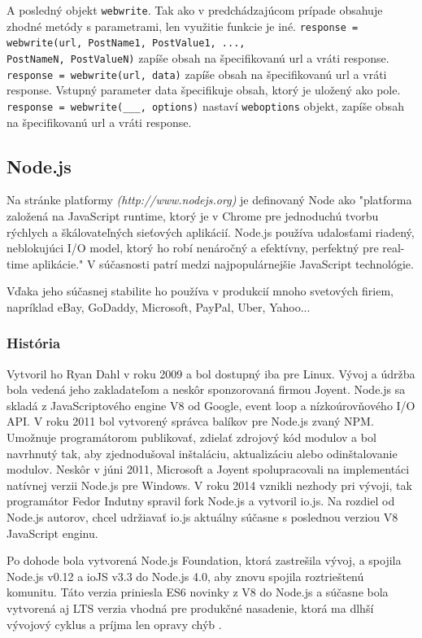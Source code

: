 A posledný objekt \verb|webwrite|. Tak ako v predchádzajúcom prípade obsahuje zhodné metódy s parametrami, len využitie funkcie je iné. \verb|response = webwrite(url, PostName1, PostValue1, ...,| \\ \verb|PostNameN, PostValueN)| zapíše obsah na špecifikovanú url a vráti response.\\ \verb|response = webwrite(url, data)| zapíše obsah na špecifikovanú url a vráti response. Vstupný parameter data špecifikuje obsah, ktorý je uložený ako pole.\\
\verb|response = webwrite(___, options)| nastaví \verb|weboptions| objekt, zapíše obsah na špecifikovanú url a vráti response.

\subsection{Node.js}
Na stránke platformy \textit{(http://www.nodejs.org)} je definovaný Node ako "platforma založená na JavaScript runtime, ktorý je v Chrome pre jednoduchú tvorbu rýchlych a škálovateľných sieťových aplikácií. Node.js používa udalosťami riadený, neblokujúci I/O model, ktorý ho robí nenáročný a efektívny, perfektný pre real-time aplikácie." V súčasnosti patrí medzi najpopulárnejšie JavaScript technológie.

Vďaka jeho súčasnej stabilite ho používa v produkcií mnoho svetových firiem, napríklad eBay, GoDaddy, Microsoft, PayPal, Uber, Yahoo...


\subsubsection{História}
Vytvoril ho Ryan Dahl v roku 2009 a bol dostupný iba pre Linux. Vývoj a údržba bola vedená jeho zakladateľom a neskôr sponzorovaná firmou Joyent. Node.js sa skladá z JavaScriptového engine V8 od Google, event loop a nízkoúrovňového I/O API. V roku 2011 bol vytvorený správca balíkov pre Node.js zvaný NPM. Umožnuje programátorom publikovať, zdielať zdrojový kód modulov a bol navrhnutý tak, aby zjednodušoval inštaláciu, aktualizáciu alebo odinštalovanie modulov. Neskôr v júni 2011, Microsoft a Joyent spolupracovali na implementáci natívnej verzii Node.js pre Windows. V roku 2014 vznikli nezhody pri vývoji, tak programátor Fedor Indutny spravil fork Node.js a vytvoril io.js. Na rozdiel od Node.js autorov, chcel udržiavať io.js aktuálny súčasne s poslednou verziou V8 JavaScript enginu.

Po dohode bola vytvorená Node.js Foundation, ktorá zastrešila vývoj, a spojila Node.js v0.12 a ioJS v3.3 do Node.js 4.0, aby znovu spojila roztrieštenú komunitu. Táto verzia priniesla ES6 novinky z V8 do Node.js a súčasne bola vytvorená aj LTS verzia vhodná pre produkčné nasadenie, ktorá ma dlhší vývojový cyklus a príjma len opravy chýb \cite{nodejs-wiki}.

